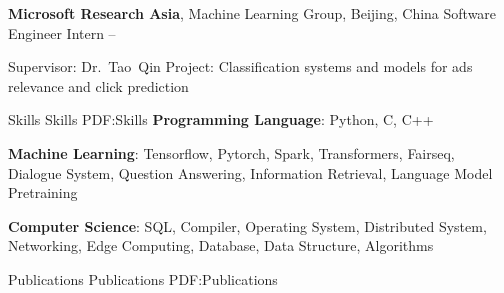 \documentclass[letterpaper,MMMyyyy,nonstopmode]{simpleresumecv}
\begin{document}
\begin{Body}
\BigGap
\Entry
\textbf{Microsoft Research Asia},
Machine Learning Group, Beijing, China
\BulletItem
Software Engineer Intern
\hfill
{} --
\begin{Detail}
\SubBulletItem
Supervisor:
Dr.~Tao~Qin
\SubBulletItem
Project:
Classification systems and models for ads relevance and click prediction
\end{Detail}


\Section
{Skills}
{Skills}
{PDF:Skills}
\BulletItem
\textbf{Programming Language}: Python, C, C++

\BulletItem
\textbf{Machine Learning}: Tensorflow, Pytorch, Spark, Transformers, Fairseq, 
Dialogue System, Question Answering, Information Retrieval, Language Model Pretraining

\BulletItem
\textbf{Computer Science}: SQL, Compiler, Operating System, Distributed System,
Networking, Edge Computing, Database, Data Structure, Algorithms


\Section
{Publications}
{Publications}
{PDF:Publications}





\end{Body}
\end{document}
